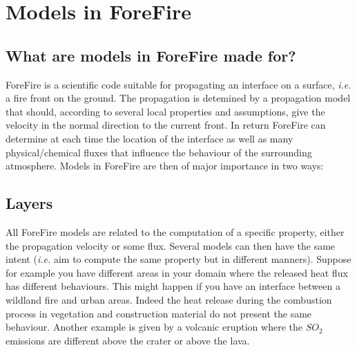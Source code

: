 \part{Models in ForeFire}

\chapter{What are models in ForeFire made for?}

ForeFire is a scientific code suitable for propagating an interface on a surface, \textit{i.e.} a fire front on the ground. The propagation is detemined by a propagation model that should, according to several local properties and assumptions, give the velocity in the normal direction to the current front. In return ForeFire can determine at each time the location of the interface as well as many physical/chemical fluxes that influence the behaviour of the surrounding atmosphere. Models in ForeFire are then of major importance in two ways:

\begin{center}
\end{center}


\chapter{Layers}

All ForeFire models are related to the computation of a specific property, either the propagation velocity or some flux. Several models can then have the same intent (\textit{i.e.} aim to compute the same property but in different manners). Suppose for example you have different areas in your domain where the released heat flux has different behaviours. This might happen if you have an interface between a wildland fire and urban areas. Indeed the heat release during the combustion process in vegetation and construction material do not present the same behaviour. Another example is given by a volcanic eruption where the $SO_{2}$ emissions are different above the crater or above the lava.

